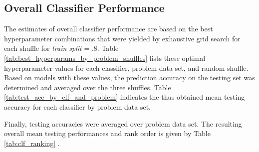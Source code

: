 \documentclass[twoside,11pt]{article}
\begin{document}
		\subsection{Overall Classifier Performance}
			The estimates of overall classifier performance are based on the best hyperparameter combinations that were yielded by exhaustive grid search for each shuffle for \textit{train split} = .8. Table \ref{tab:best_hyperparams_by_problem_shuffles} lists these optimal hyperparameter values for each classifier, problem data set, and random shuffle. Based on models with these values, the prediction accuracy on the testing set was determined and averaged over the three shuffles. Table \ref{tab:test_acc_by_clf_and_problem} indicates the thus obtained mean testing accuracy for each classifier by problem data set.
			
			Finally, testing accuracies were averaged over problem data set. The resulting overall mean testing performances and rank order is given by Table \ref{tab:clf_ranking} .
			
			\begin{table}[h]
				\caption{Best hyperparameter values after grid search by classifier and problem in each of three random shuffles (0.8 train split):}
				\label{tab:best_hyperparams_by_problem_shuffles}
			
			\end{table}
			
\end{document}
